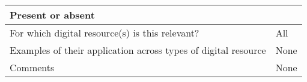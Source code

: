 \documentclass[english]{article}
\begin{document}
\begin{longtable}{|p{5cm}|p{9cm}|}
Present or absent


\\



\hline
For which digital resource(s) is this relevant? &  All\\



\hline
Examples of their application across types of digital resource &  

None


\\



\hline

Comments & 


None

 \\ 
\hline

\end{longtable}


\newpage
\end{document}
